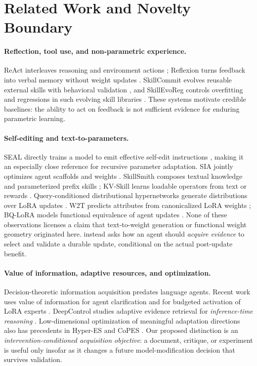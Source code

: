 \section{Related Work and Novelty Boundary}
\label{sec:related}

\paragraph{Reflection, tool use, and non-parametric experience.}
ReAct interleaves reasoning and environment actions
\citep{yao2023react}; Reflexion turns feedback into verbal memory without
weight updates \citep{shinn2023reflexion}. SkillCommit evolves reusable
external skills with behavioral validation \citep{he2026skillcommit},
and SkillEvoReg controls overfitting and regressions in such evolving
skill libraries \citep{nie2026skillevoreg}. These systems motivate
credible baselines: the ability to act on feedback is not sufficient
evidence for enduring parametric learning.

\paragraph{Self-editing and text-to-parameters.}
SEAL directly trains a model to emit effective self-edit instructions
\citep{zweiger2025seal}, making it an especially close reference for
recursive parameter adaptation. SIA jointly optimizes agent scaffolds and
weights \citep{hebbar2026sia}. SkillSmith composes textual knowledge and
parameterized prefix skills \citep{dery2026skillsmith}; KV-Skill learns
loadable operators from text or rewards \citep{han2026kvskill}.
Query-conditioned distributional hypernetworks generate distributions
over LoRA updates \citep{khan2026distributional}. W2T predicts attributes
from canonicalized LoRA weights \citep{han2026w2t}; BQ-LoRA models
functional equivalence of agent updates \citep{zhou2026bqlora}.
None of these observations licenses a claim that text-to-weight
generation or functional weight geometry originated here.
\spear{} instead asks how an agent should \emph{acquire evidence} to
select and validate a durable update, conditional on the actual
post-update benefit.

\paragraph{Value of information, adaptive resources, and optimization.}
Decision-theoretic information acquisition predates language agents.
Recent work uses value of information for agent clarification
\citep{dong2026voi} and for budgeted activation of LoRA experts
\citep{saliencro2026vimole}. DeepControl studies adaptive evidence
retrieval for \emph{inference-time reasoning}
\citep{xiong2026deepcontrol}. Low-dimensional optimization of
meaningful adaptation directions also has precedents in Hyper-ES
\citep{gu2026hyperes} and CoPES \citep{wang2026copes}.
Our proposed distinction is an \emph{intervention-conditioned acquisition
objective}: a document, critique, or experiment is useful only insofar as
it changes a future model-modification decision that survives validation.

